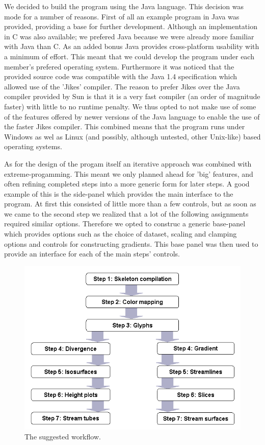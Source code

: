 \documentclass[a4paper,11pt,twoside]{report}
\begin{document}
	We decided to build the program using the Java language. This decision was mode for a number of reasons. First of all an example program in Java was provided, providing a base for further development. Although an implementation in C was also available; we prefered Java because we were already more familiar with Java than C. As an added bonus Java provides cross-platform usability with a minimum of effort. This meant that we could develop the program under each member's prefered operating system. Furthermore it was noticed that the provided source code was compatible with the Java 1.4 specification which allowed use of the 'Jikes' compiler. The reason to prefer Jikes over the Java compiler provided by Sun is that it is a very fast compiler (an order of magnitude faster) with little to no runtime penalty. We thus opted to not make use of some of the features offered by newer versions of the Java language to enable the use of the faster Jikes compiler. This combined means that the program runs under Windows as wel as Linux (and possibly, although untested, other Unix-like) based operating systems.

	As for the design of the progam itself an iterative approach was combined with extreme-progamming. This meant we only planned ahead for 'big' features, and often refining completed steps into a more generic form for later steps. A good example of this is the side-panel which provides the main interface to the program. At first this consisted of little more than a few controls, but as soon as we came to the second step we realized that a lot of the following assignments required similar options. Therefore we opted to construc a generic base-panel which provides options such as the choice of dataset, scaling and clamping options and controls for constructing gradients. This base panel was then used to provide an interface for each of the main steps' controls.

	\begin{figure}[h]
	\centering
	\includegraphics[scale=\imagescalefactor]{images/overview.png}
	\caption{The suggested workflow.}\label{fig:overview}
	\end{figure}
\end{document}
